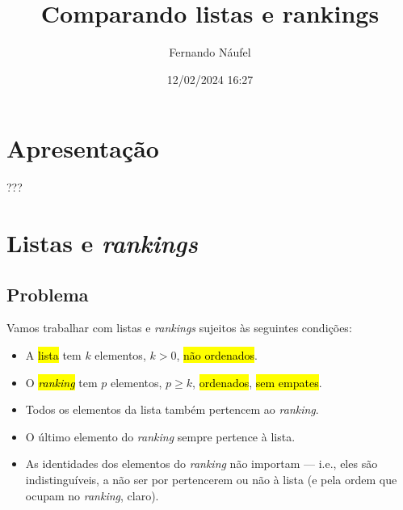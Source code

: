 \documentclass[
  letterpaper,
  DIV=11,
  numbers=noendperiod]{scrreprt}
\title{Comparando listas e rankings}
\author{Fernando Náufel}
\date{12/02/2024 16:27}
\renewcommand*\contentsname{Índice}
\newcommand\contentsname{Índice}
\begin{document}
\maketitle

\makeatletter
{}
{}
{}
\makeatother


\renewcommand*\contentsname{Índice}
{
\hypersetup{linkcolor=}
\setcounter{tocdepth}{2}
\tableofcontents
}

\chapter*{Apresentação}\label{apresentauxe7uxe3o}


???


\chapter{\texorpdfstring{Listas e
\emph{rankings}}{Listas e rankings}}\label{listas-e-rankings}

\section{Problema}\label{problema}

Vamos trabalhar com listas e \emph{rankings} sujeitos às seguintes
condições:

\begin{itemize}
\item
  A {\hl{lista}} tem $k$ elementos, $k > 0$, {\hl{não ordenados}}.
\item
  O {\hl{\emph{ranking}}} tem $p$ elementos, $p \geq k$,
  {\hl{ordenados}}, {\hl{sem empates}}.
\item
  Todos os elementos da lista também pertencem ao \emph{ranking}.
\item
  O último elemento do \emph{ranking} sempre pertence à lista.
\item
  As identidades dos elementos do \emph{ranking} não importam --- i.e.,
  eles são indistinguíveis, a não ser por pertencerem ou não à lista (e
  pela ordem que ocupam no \emph{ranking}, claro).
\end{itemize}
\end{document}
